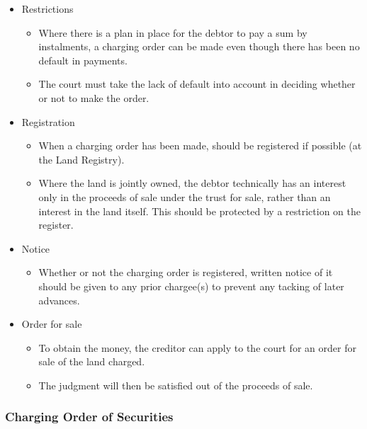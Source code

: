 \documentclass[
]{article}
\providecommand{\tightlist}{%
  \setlength{\itemsep}{0pt}\setlength{\parskip}{0pt}}
\begin{document}
\begin{itemize}
\tightlist
\item
  Restrictions

  \begin{itemize}
  \tightlist
  \item
    Where there is a plan in place for the debtor to pay a sum by
    instalments, a charging order can be made even though there has been
    no default in payments.
  \item
    The court must take the lack of default into account in deciding
    whether or not to make the order.
  \end{itemize}
\item
  Registration

  \begin{itemize}
  \tightlist
  \item
    When a charging order has been made, should be registered if
    possible (at the Land Registry).
  \item
    Where the land is jointly owned, the debtor technically has an
    interest only in the proceeds of sale under the trust for sale,
    rather than an interest in the land itself. This should be protected
    by a restriction on the register.
  \end{itemize}
\item
  Notice

  \begin{itemize}
  \tightlist
  \item
    Whether or not the charging order is registered, written notice of
    it should be given to any prior chargee(s) to prevent any tacking of
    later advances.
  \end{itemize}
\item
  Order for sale

  \begin{itemize}
  \tightlist
  \item
    To obtain the money, the creditor can apply to the court for an
    order for sale of the land charged.
  \item
    The judgment will then be satisfied out of the proceeds of sale.
  \end{itemize}
\end{itemize}

\hypertarget{charging-order-of-securities}{%
\subsubsection{Charging Order of
Securities}\label{charging-order-of-securities}}
\end{document}
